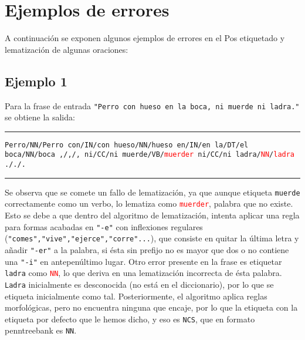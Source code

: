 \section{Ejemplos de errores}
A continuación se exponen algunos ejemplos de errores en el Pos etiquetado y lematización de \newline algunas oraciones: 
\subsection*{Ejemplo 1}
Para la frase de entrada \texttt{"Perro con hueso en la boca, ni muerde ni ladra."} se obtiene la salida: \newline

\noindent\rule{14cm}{0.4pt}\newline
\texttt{Perro/NN/Perro\newline
con/IN/con\newline
hueso/NN/hueso\newline
en/IN/en\newline
la/DT/el\newline
boca/NN/boca\newline
,/,/,\newline
ni/CC/ni\newline
muerde/VB/\textcolor{red}{muerder}\newline
ni/CC/ni\newline
ladra/\textcolor{red}{NN}/\textcolor{red}{ladra}\newline
././.\newline
}
\noindent\rule{14cm}{0.4pt}\newline

Se observa que se comete un fallo de lematización, ya que aunque etiqueta \texttt{muerde} correctamente como un verbo, lo lematiza como \texttt{\textcolor{red}{muerder}}, palabra que no existe. Esto se debe a que dentro del algoritmo de lematización, intenta aplicar una regla para formas acabadas en \texttt{"-e"} con inflexiones \newline regulares (\texttt{"comes","vive","ejerce","corre"...}), que consiste en quitar la última letra y añadir \texttt{"-er"} a la palabra, si ésta sin prefijo no es mayor que dos o no contiene una \texttt{"-i"} en antepenúltimo lugar. Otro error presente en la frase es etiquetar \texttt{ladra} como \texttt{\textcolor{red}{NN}}, lo que deriva en una lematización incorrecta de ésta palabra. \texttt{Ladra} inicialmente es desconocida (no está en el diccionario), por lo que se etiqueta inicialmente como tal. Posteriormente, el algoritmo aplica reglas morfológicas, pero no encuentra ninguna que encaje, por lo que la etiqueta con la etiqueta por defecto que le hemos dicho, y eso es \texttt{NCS}, que en formato penntreebank es \texttt{NN}.
